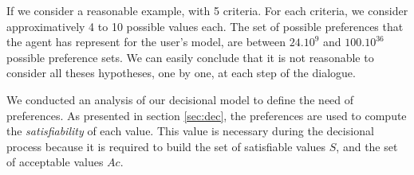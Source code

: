 \documentclass[conference, letterpaper]{IEEEtran}
\begin{document}
		If we consider a reasonable example, with 5 criteria. For each criteria, we consider approximatively 4 to 10 possible values each. The set of possible preferences that the agent has represent for the user's model, are between $24.10^9$ and $100.10^{36}$ possible preference sets. 
		We can easily conclude that it is not reasonable to consider all theses hypotheses, one by one, at each step of the dialogue.
	
	
	
		We conducted an analysis of our decisional model to define the need of preferences. As presented in section \ref{sec:dec}, the preferences are used to compute the \emph{satisfiability} of each value. %
		 This value is necessary during the decisional process because it is required to build the set of satisfiable values $S$, and the set of acceptable values $Ac$.   
	
\end{document}
